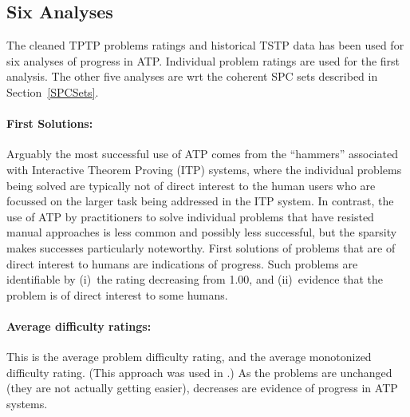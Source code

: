 \documentclass[runningheads]{llncs}
\begin{document}
\subsection{Six Analyses}
\label{AnalysisTypes}

The cleaned TPTP problems ratings and historical TSTP data has been used for six analyses of 
progress in ATP.
Individual problem ratings are used for the first analysis.
The other five analyses are wrt the coherent SPC sets described in Section~\ref{SPCSets}.

\vspace*{-0.5em}
\paragraph{First Solutions:}
Arguably the most successful use of ATP comes from the ``hammers'' \cite{BK+16} associated with 
Interactive Theorem Proving (ITP) systems, where the individual problems being solved are 
typically not of direct interest to the human users who are focussed on the larger task being 
addressed in the ITP system.
In contrast, the use of ATP by practitioners to solve individual problems that have resisted
manual approaches is less common and possibly less successful, but the sparsity makes successes 
particularly noteworthy. 
First solutions of problems that are of direct interest to humans are indications of progress.
Such problems are identifiable by (i)~the rating decreasing from 1.00, and (ii)~evidence that the 
problem is of direct interest to some humans.

\vspace*{-0.5em}
\paragraph{Average difficulty ratings:}
This is the average problem difficulty rating, and the average monotonized difficulty rating.
(This approach was used in \cite{SFS01}.)
As the problems are unchanged (they are not actually getting easier), decreases are 
evidence of progress in ATP systems.

\vspace*{-0.5em}
\end{document}
